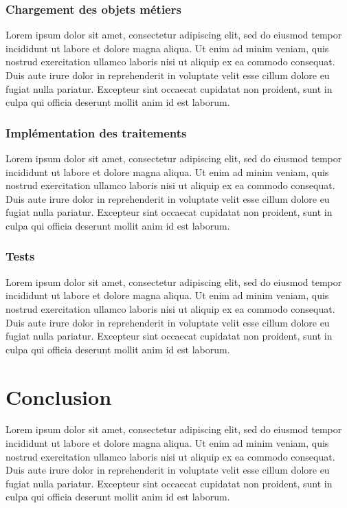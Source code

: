 \documentclass[a4paper, 12pt]{report}
\begin{document}
\subsection{Chargement des objets métiers}

Lorem ipsum dolor sit amet, consectetur adipiscing elit, sed do eiusmod tempor incididunt ut labore et dolore magna aliqua. Ut enim ad minim veniam, quis nostrud exercitation ullamco laboris nisi ut aliquip ex ea commodo consequat. Duis aute irure dolor in reprehenderit in voluptate velit esse cillum dolore eu fugiat nulla pariatur. Excepteur sint occaecat cupidatat non proident, sunt in culpa qui officia deserunt mollit anim id est laborum.

\subsection{Implémentation des traitements}

Lorem ipsum dolor sit amet, consectetur adipiscing elit, sed do eiusmod tempor incididunt ut labore et dolore magna aliqua. Ut enim ad minim veniam, quis nostrud exercitation ullamco laboris nisi ut aliquip ex ea commodo consequat. Duis aute irure dolor in reprehenderit in voluptate velit esse cillum dolore eu fugiat nulla pariatur. Excepteur sint occaecat cupidatat non proident, sunt in culpa qui officia deserunt mollit anim id est laborum.

\subsection{Tests}

Lorem ipsum dolor sit amet, consectetur adipiscing elit, sed do eiusmod tempor incididunt ut labore et dolore magna aliqua. Ut enim ad minim veniam, quis nostrud exercitation ullamco laboris nisi ut aliquip ex ea commodo consequat. Duis aute irure dolor in reprehenderit in voluptate velit esse cillum dolore eu fugiat nulla pariatur. Excepteur sint occaecat cupidatat non proident, sunt in culpa qui officia deserunt mollit anim id est laborum.

\chapter*{Conclusion}

Lorem ipsum dolor sit amet, consectetur adipiscing elit, sed do eiusmod tempor incididunt ut labore et dolore magna aliqua. Ut enim ad minim veniam, quis nostrud exercitation ullamco laboris nisi ut aliquip ex ea commodo consequat. Duis aute irure dolor in reprehenderit in voluptate velit esse cillum dolore eu fugiat nulla pariatur. Excepteur sint occaecat cupidatat non proident, sunt in culpa qui officia deserunt mollit anim id est laborum.
\end{document}
